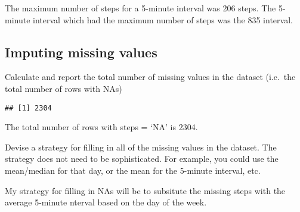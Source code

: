 \documentclass[]{article}
\newenvironment{Shaded}{\begin{snugshade}}{\end{snugshade}}
\newcommand{\KeywordTok}[1]{\textcolor[rgb]{0.13,0.29,0.53}{\textbf{#1}}}
\newcommand{\DataTypeTok}[1]{\textcolor[rgb]{0.13,0.29,0.53}{#1}}
\newcommand{\StringTok}[1]{\textcolor[rgb]{0.31,0.60,0.02}{#1}}
\newcommand{\OperatorTok}[1]{\textcolor[rgb]{0.81,0.36,0.00}{\textbf{#1}}}
\newcommand{\NormalTok}[1]{#1}
\begin{document}
The maximum number of steps for a 5-minute interval was 206 steps. The
5-minute interval which had the maximum number of steps was the 835
interval.

\subsection{Imputing missing values}\label{imputing-missing-values}

Calculate and report the total number of missing values in the dataset
(i.e.~the total number of rows with NAs)

\begin{Shaded}
\end{Shaded}

\begin{verbatim}
## [1] 2304
\end{verbatim}

The total number of rows with steps = `NA' is 2304.

Devise a strategy for filling in all of the missing values in the
dataset. The strategy does not need to be sophisticated. For example,
you could use the mean/median for that day, or the mean for the 5-minute
interval, etc.

My strategy for filling in NAs will be to subsitute the missing steps
with the average 5-minute nterval based on the day of the week.

\begin{Shaded}
\end{Shaded}
\end{document}
